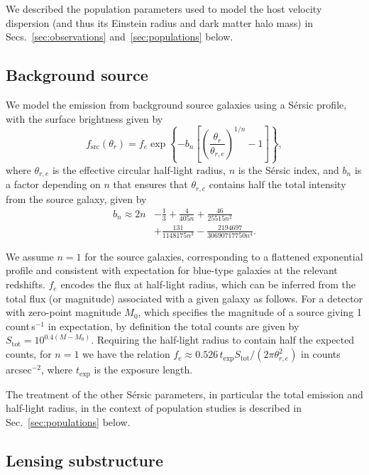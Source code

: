 \documentclass[twocolumn]{aastex62}
\begin{document}
We described the population parameters used to model the host velocity dispersion (and thus its Einstein radius and dark matter halo mass) in Secs.~\ref{sec:observations} and~\ref{sec:populations} below.

\subsection{Background source}
\label{sec:source}

We model the emission from background source galaxies using a S\'{e}rsic profile, with the surface brightness given by~\citep{1963BAAA....6...41S}
\begin{equation}
f_\mathrm{src}(\theta_r)=f_{e} \exp \left\{-b_{n}\left[\left(\frac{\theta_r}{\theta_{r,e}}\right)^{1 / n}-1\right]\right\},
\end{equation}
where $\theta_{r,e}$ is the effective circular half-light radius, $n$ is the S\'{e}rsic index, and $b_n$ is a factor depending on $n$ that ensures that $\theta_{r,e}$ contains half the total intensity from the source galaxy, given by~\citep{1999A&A...352..447C}
\begin{align}
b_n \approx 2 n &- \frac{1}{3} + \frac{4}{405 n} + \frac{46}{25515 n^2} \nonumber \\ &+ \frac{131}{1148175 n^3} - \frac{2194697}{30690717750 n^4}. \nonumber
\end{align}

We assume $n=1$ for the source galaxies, corresponding to a flattened exponential profile and consistent with expectation for blue-type galaxies at the relevant redshifts. $f_{e}$ encodes the flux at half-light radius, which can be inferred from the total flux (or magnitude) associated with a given galaxy as follows. For a detector with zero-point magnitude $M_0$, which specifies the magnitude of a source giving 1 count\,s$^{-1}$ in expectation, by definition the total counts are given by $S_\mathrm{tot}=10^{0.4(M-M_0)}$. Requiring the half-light radius to contain half the expected counts, for $n=1$ we have the relation $f_{e} \approx 0.526\,t_\mathrm{exp}S_\mathrm{tot} /(2\pi \theta_{r,e}^2)$ in counts\,arcsec$^{-2}$, where $t_\mathrm{exp}$ is the exposure length.

The treatment of the other S\'{e}rsic parameters, in particular the total emission and half-light radius, in the context of population studies is described in Sec.~\ref{sec:populations} below.

\subsection{Lensing substructure}
\end{document}
